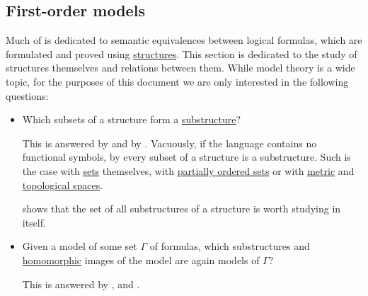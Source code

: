 \subsection{First-order models}\label{subsec:first_order_models}

Much of  is dedicated to semantic equivalences between logical formulas, which are formulated and proved using \hyperref[def:first_order_structure]{structures}. This section is dedicated to the study of structures themselves and relations between them. While model theory is a wide topic, for the purposes of this document we are only interested in the following questions:

\begin{itemize}
  \item Which subsets of a structure form a \hyperref[def:first_order_substructure]{substructure}?

  This is answered by  and by . Vacuously, if the language contains no functional symbols, by  every subset of a structure is a substructure. Such is the case with \hyperref[def:set]{sets} themselves, with \hyperref[def:poset]{partially ordered sets} or with \hyperref[def:metric_space]{metric} and \hyperref[def:topological_space]{topological spaces}.

   shows that the set of all substructures of a structure is worth studying in itself.

  \item Given a model of some set \( \Gamma \) of formulas, which substructures and \hyperref[def:first_order_homomorphism]{homomorphic} images of the model are again models of \( \Gamma \)?

  This is answered by ,  and .
\end{itemize}

